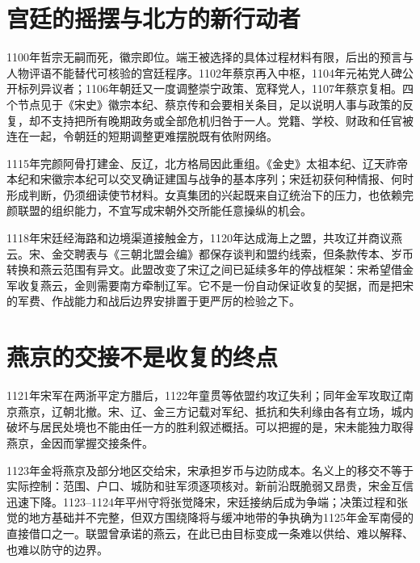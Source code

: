 \section{宫廷的摇摆与北方的新行动者}

1100年哲宗无嗣而死，徽宗即位。端王被选择的具体过程材料有限，后出的预言与人物评语不能替代可核验的宫廷程序。1102年蔡京再入中枢，1104年元祐党人碑公开标列异议者；1106年朝廷又一度调整崇宁政策、宽释党人，1107年蔡京复相。四个节点见于《宋史》徽宗本纪、蔡京传和会要相关条目，足以说明人事与政策的反复，却不支持把所有晚期政务或全部危机归咎于一人。党籍、学校、财政和任官被连在一起，令朝廷的短期调整更难摆脱既有依附网络。

1115年完颜阿骨打建金、反辽，北方格局因此重组。《金史》太祖本纪、辽天祚帝本纪和宋徽宗本纪可以交叉确证建国与战争的基本序列；宋廷初获何种情报、何时形成判断，仍须细读使节材料。女真集团的兴起既来自辽统治下的压力，也依赖完颜联盟的组织能力，不宜写成宋朝外交所能任意操纵的机会。

1118年宋廷经海路和边境渠道接触金方，1120年达成海上之盟，共攻辽并商议燕云。宋、金交聘表与《三朝北盟会编》都保存谈判和盟约线索，但条款传本、岁币转换和燕云范围有异文。此盟改变了宋辽之间已延续多年的停战框架：宋希望借金军收复燕云，金则需要南方牵制辽军。它不是一份自动保证收复的契据，而是把宋的军费、作战能力和战后边界安排置于更严厉的检验之下。

\section{燕京的交接不是收复的终点}

1121年宋军在两浙平定方腊后，1122年童贯等依盟约攻辽失利；同年金军攻取辽南京燕京，辽朝北撤。宋、辽、金三方记载对军纪、抵抗和失利缘由各有立场，城内破坏与居民处境也不能由任一方的胜利叙述概括。可以把握的是，宋未能独力取得燕京，金因而掌握交接条件。

1123年金将燕京及部分地区交给宋，宋承担岁币与边防成本。名义上的移交不等于实际控制：范围、户口、城防和驻军须逐项核对。新前沿既脆弱又昂贵，宋金互信迅速下降。1123--1124年平州守将张觉降宋，宋廷接纳后成为争端；决策过程和张觉的地方基础并不完整，但双方围绕降将与缓冲地带的争执确为1125年金军南侵的直接借口之一。联盟曾承诺的燕云，在此已由目标变成一条难以供给、难以解释、也难以防守的边界。
